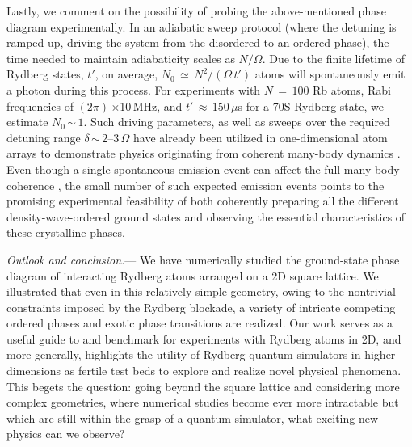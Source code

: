 \documentclass[prl,twocolumn,superscriptaddress,showpacs,amsmath,amstex,amssymb,citeautoscript]{revtex4-1}
\begin{document}
Lastly, we comment on the possibility of probing the above-mentioned phase diagram experimentally. 
In an adiabatic sweep protocol (where the detuning is ramped up, driving the system from the disordered to an ordered phase), the time needed to maintain adiabaticity scales as $N/\Omega$. Due to the finite lifetime of Rydberg states, $t'$, on average, $N_0$\,$\simeq$\,$N^2/(\Omega\, t')$ atoms will spontaneously emit a photon during this process. For experiments with $N$\,$=$\,$100$ Rb atoms, Rabi frequencies of $(2\pi)$\,$\times$10\,MHz, and $t'$\,$\approx$\,$150\, \mu$s for a 70S Rydberg state, we estimate $N_0$\,$\sim$\,$1$. Such driving parameters, as well as sweeps over the required detuning range $\delta$\,$\sim$\,$2\mbox{--}3\,\Omega$ have already been utilized in one-dimensional atom arrays \cite{endres2016atom} to demonstrate physics originating from coherent many-body dynamics \cite{bernien2017probing,keesling2019quantum, levine2018high, Omran570}. 
Even though a single spontaneous emission event can affect the full many-body coherence \cite{glaetzle2017coherent,zeiher2017coherent,de2018coherent,lee2019coherent}, the small number of such expected emission events points to the promising experimental feasibility of both coherently preparing all the different density-wave-ordered ground states and observing the essential characteristics of these crystalline phases. 

 \emph{Outlook and conclusion.}---
We have numerically studied the ground-state phase diagram of interacting Rydberg atoms arranged on a 2D square lattice. We illustrated that even in this relatively simple geometry, owing to the nontrivial constraints imposed by the Rydberg blockade, a variety of intricate competing ordered phases and exotic phase transitions are realized. 
Our work serves as a useful guide to and benchmark for experiments with Rydberg atoms in 2D, and more generally, highlights the utility of Rydberg quantum simulators \cite{weimer2010rydberg} in higher dimensions as fertile test beds to explore and realize novel physical phenomena.
This begets the question: going beyond the square lattice and considering more complex geometries,
where numerical studies become ever more intractable but which are still within the grasp of a quantum simulator, what exciting new physics can we %
observe? 
\end{document}

